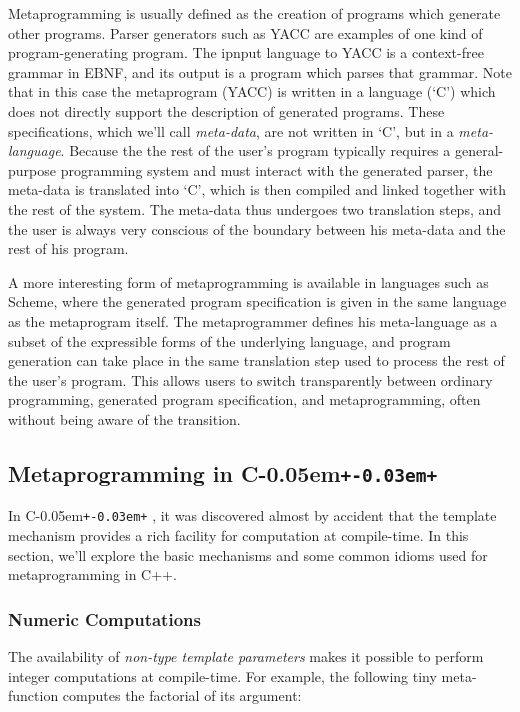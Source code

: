 \documentclass{netobjectdays}
\newcommand{\Cpp}{C\kern-0.05em\texttt{+\kern-0.03em+}%
}
\newcommand{\mping}{meta\-program\-ming}
\newcommand{\mpgm}{meta\-program}
\begin{document}
Metaprogramming is usually defined as the creation of programs which
generate other programs. Parser generators such as YACC are examples
of one kind of program-generating program. The ipnput language to YACC
is a context-free grammar in EBNF, and its output is a program which
parses that grammar. Note that in this case the \mpgm{} (YACC) is
written in a language (`C') which does not directly support the
description of generated programs. These specifications, which we'll
call \emph{meta-data}, are not written in `C', but in a
\emph{meta-language}. Because the the rest of the user's program
typically requires a general-purpose programming system and must
interact with the generated parser, the meta-data is translated into
`C', which is then compiled and linked together with the rest of the
system. The meta-data thus undergoes two translation steps, and the
user is always very conscious of the boundary between his meta-data
and the rest of his program.

A more interesting form of \mping{} is available in languages
such as Scheme, where the generated program specification is given in
the same language as the \mpgm{} itself. The metaprogrammer
defines his meta-language as a subset of the expressible forms of the
underlying language, and program generation can take place in the same
translation step used to process the rest of the user's program. This
allows users to switch transparently between ordinary programming,
generated program specification, and \mping{}, often without
being aware of the transition.

\subsection{Metaprogramming in \Cpp{}}

In \Cpp, it was discovered almost by accident that the template
mechanism provides a rich facility for computation at compile-time. In
this section, we'll explore the basic mechanisms and some common
idioms used for metaprogramming in C++.

\subsubsection{Numeric Computations}

The availability of \emph{non-type template parameters} makes it
possible to perform integer computations at compile-time. For example,
the following tiny meta-function computes the factorial of its
argument:
\end{document}
